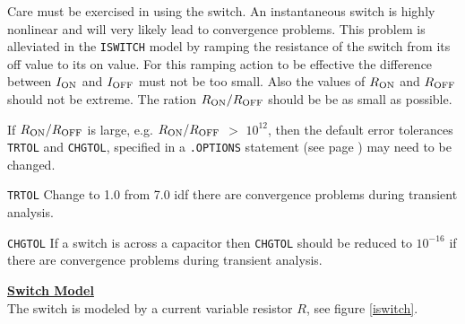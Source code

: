 
Care must be exercised in using the switch.  An instantaneous switch
is highly nonlinear and will very likely lead to convergence problems.
This problem is alleviated in the {\tt ISWITCH} model by ramping the resistance
of the switch from its off value to its on value.  For this ramping action to be
effective the difference between $I_{\mbox{\scriptsize ON}}$ and $I_{\mbox{\scriptsize OFF}}$
must not be too small. Also the values of $R_{\mbox{\scriptsize ON}}$ and $R_{\mbox{\scriptsize OFF}}$
should not be extreme.
The ration $R_{\mbox{\scriptsize ON}}/R_{\mbox{\scriptsize OFF}}$ should be be as small as possible.

If $R_{\mbox{\scriptsize ON}}/R_{\mbox{\scriptsize OFF}}$  is large, e.g.
$R_{\mbox{\scriptsize ON}}/R_{\mbox{\scriptsize OFF}}$ $>$ $10^{12}$, then the default error tolerances
{\tt TRTOL} and {\tt CHGTOL}, specified in a {\tt .OPTIONS} statement
(see page \pageref{.OPTIONSstatement}) may need to be changed.
\begin{widelist}
\item[{\tt TRTOL}] Change to 1.0 from 7.0 idf there are convergence problems
during transient analysis.
\item[{\tt CHGTOL}] If a switch is across a capacitor then {\tt CHGTOL} should be
reduced to $10^{-16}$ if there are convergence problems
during transient analysis.
\end{widelist}
\noindent\underline{\bf \large Switch Model}\\[0.1in]

The switch is modeled by a current variable resistor $R$, see figure \ref{iswitch}.

